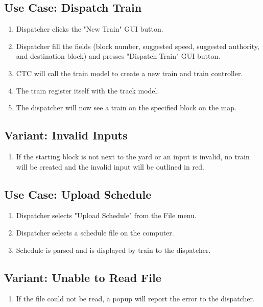 \documentclass{scrreprt}
\begin{document}
\subsection{Use Case: Dispatch Train}
\begin{enumerate}
	\item Dispatcher clicks the "New Train" GUI button.
	\item Dispatcher fill the fields (block number, suggested speed, suggested authority, and destination block) and presses "Dispatch Train" GUI button.
	\item CTC will call the train model to create a new train and train controller.
	\item The train register itself with the track model.
	\item The dispatcher will now see a train on the specified block on the map.
\end{enumerate}

\subsection{Variant: Invalid Inputs}
\begin{enumerate}[label=\arabic*a., start=3]
	\item If the starting block is not next to the yard or an input is invalid, no train will be created and the invalid input will be outlined in red.
\end{enumerate}

\subsection{Use Case: Upload Schedule}
\begin{enumerate}
	\item Dispatcher selects "Upload Schedule" from the File menu.
	\item Dispatcher selects a schedule file on the computer.
	\item Schedule is parsed and is displayed by train to the dispatcher.
\end{enumerate}

\subsection{Variant: Unable to Read File}
\begin{enumerate}[label=\arabic*a., start=3]
	\item If the file could not be read, a popup will report the error to the dispatcher.
\end{enumerate}
\end{document}
